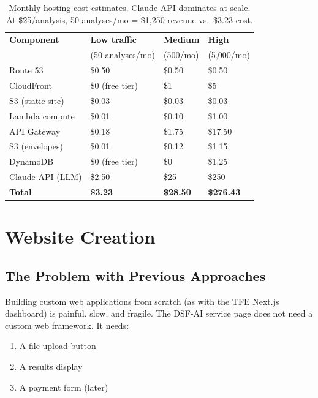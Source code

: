 \documentclass[11pt,letterpaper]{article}
\begin{document}
\begin{table}[h]
\centering
\begin{tabular}{@{}llll@{}}
\toprule
\textbf{Component} & \textbf{Low traffic} & \textbf{Medium} &
  \textbf{High} \\
 & (50 analyses/mo) & (500/mo) & (5{,}000/mo) \\
\midrule
Route 53 & \$0.50 & \$0.50 & \$0.50 \\
CloudFront & \$0 (free tier) & \$1 & \$5 \\
S3 (static site) & \$0.03 & \$0.03 & \$0.03 \\
Lambda compute & \$0.01 & \$0.10 & \$1.00 \\
API Gateway & \$0.18 & \$1.75 & \$17.50 \\
S3 (envelopes) & \$0.01 & \$0.12 & \$1.15 \\
DynamoDB & \$0 (free tier) & \$0 & \$1.25 \\
Claude API (LLM) & \$2.50 & \$25 & \$250 \\
\midrule
\textbf{Total} & \textbf{\$3.23} & \textbf{\$28.50} & \textbf{\$276.43} \\
\bottomrule
\end{tabular}
\caption{Monthly hosting cost estimates. Claude API dominates at scale.
At \$25/analysis, 50 analyses/mo = \$1{,}250 revenue vs.\ \$3.23 cost.}
\end{table}

\section{Website Creation}

\subsection{The Problem with Previous Approaches}

Building custom web applications from scratch (as with the TFE
Next.js dashboard) is painful, slow, and fragile. The DSF-AI
service page does not need a custom web framework. It needs:

\begin{enumerate}
  \item A file upload button
  \item A results display
  \item A payment form (later)
\end{enumerate}
\end{document}
